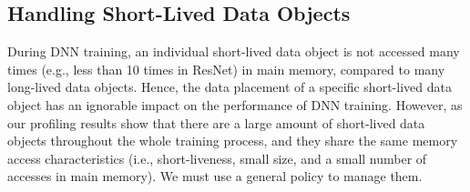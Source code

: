 






\vspace{-3pt}
\subsection{Handling Short-Lived Data Objects}
\label{sec:short-lived}
During DNN training, an individual short-lived data object is not accessed many times (e.g., less than 10 times in ResNet) in main memory, compared to many long-lived data objects. Hence, the data placement of a specific short-lived data object has an ignorable impact on the performance of DNN training. However, as our profiling results show that there are a large amount of short-lived data objects throughout the whole training process, and they share the same memory access characteristics (i.e., short-liveness, small size, and a small number of accesses in main memory). We must use a general policy to manage them.   

